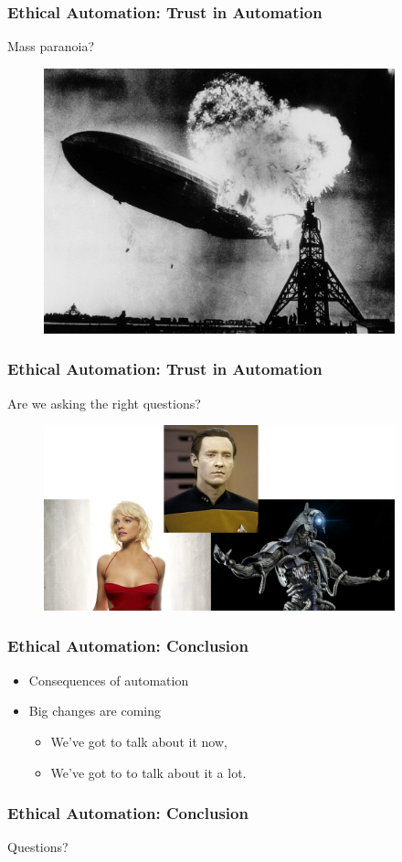 \begin{frame}
  \frametitle{ Ethical Automation: Trust in Automation}
  {\Large Mass paranoia?}
  \begin{figure}[bht]
    \centering
    \includegraphics[width=4.0in]{diagrams/Hindenburg}
  \end{figure}
\end{frame}

\begin{frame}
  \frametitle{ Ethical Automation: Trust in Automation}
  {\Large Are we asking the right questions?}
  \begin{figure}[bht]
    \centering
    \includegraphics[width=4.0in]{diagrams/AIs}
  \end{figure}
\end{frame}

\begin{frame}
  \frametitle{ Ethical Automation: Conclusion}
  \begin{itemize}
    \item Consequences of automation
    \item Big changes are coming
      \begin{itemize}
        \item We've got to talk about it now,
        \item We've got to to talk about it a lot.
      \end{itemize}
  \end{itemize}
\end{frame}


\begin{frame}
  \frametitle{ Ethical Automation: Conclusion}
  \Large Questions?
\end{frame}

